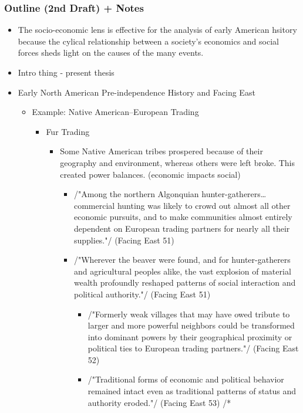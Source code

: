 \documentclass[letterpaper]{article}
\begin{document}
\subsubsection{Outline (2nd Draft) + Notes}
\label{sec:orga74fcc9}
\begin{itemize}
\item The socio-economic lens is effective for the analysis of early
American hsitory because the cylical relationship between a society's
economics and social forces sheds light on the causes of the many
events.

\item Intro thing - present thesis
\item Early North American Pre-independence History and Facing East

\begin{itemize}
\item Example: Native American--European Trading

\begin{itemize}
\item Fur Trading

\begin{itemize}
\item Some Native American tribes prospered because of their
geography and environment, whereas others were left broke. This
created power balances. (economic impacts social)

\begin{itemize}
\item /"Among the northern Algonquian hunter-gatherers\ldots{}commercial
hunting was likely to crowd out almost all other economic
pursuits, and to make communities almost entirely dependent
on European trading partners for nearly all their supplies."/
(Facing East 51)
\item /"Wherever the beaver were found, and for hunter-gatherers
and agricultural peoples alike, the vast explosion of
material wealth profoundly reshaped patterns of social
interaction and political authority."/ (Facing East 51)

\begin{itemize}
\item /"Formerly weak villages that may have owed tribute to
larger and more powerful neighbors could be transformed
into dominant powers by their geographical proximity or
political ties to European trading partners."/ (Facing
East 52)
\item /"Traditional forms of economic and political behavior
remained intact even as traditional patterns of status and
authority eroded."/ (Facing East 53) /*
\end{itemize}
\end{itemize}
\end{itemize}


\end{itemize}
\end{itemize}
\end{itemize}
\end{document}
